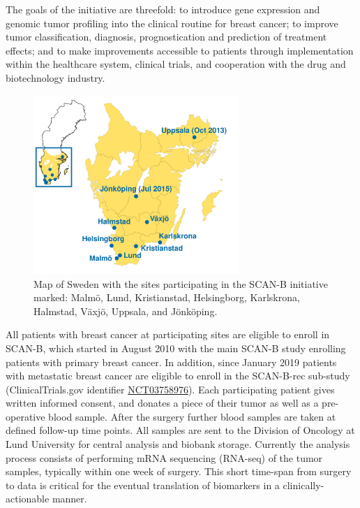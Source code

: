 \documentclass[11pt]{book}
\newcommand{\scanb}{\mbox{SCAN-B}}
\begin{document}
The goals of the initiative are threefold: to introduce gene expression and genomic tumor profiling into the clinical routine for breast cancer; to improve tumor classification, diagnosis, prognostication and prediction of treatment effects; and to make improvements accessible to patients through implementation within the healthcare system, clinical trials, and cooperation with the drug and biotechnology industry.

\begin{figure}[t]
\centering
\includegraphics[width=220pt]{img/SCANB_map_v5.pdf}
\caption[Map of Sites Participating in SCAN-B]{Map of Sweden with the sites participating in the \scanb{} initiative marked: Malmö, Lund, Kristianstad, Helsingborg, Karlskrona, Halmstad, Växjö, Uppsala, and Jönköping.}
\label{fig:scanb-map}
\end{figure}

All patients with breast cancer at participating sites are eligible to enroll in \scanb{}, which started in August 2010 with the main \scanb{} study enrolling patients with primary breast cancer. In addition, since January 2019 patients with metastatic breast cancer are eligible to enroll in the \scanb{}-rec sub-study (ClinicalTrials.gov identifier  \href{https://clinicaltrials.gov/ct2/show/NCT03758976}{NCT03758976}). Each participating patient gives written informed consent, and donates a piece of their tumor as well as a pre-operative blood sample. After the surgery further blood samples are taken at defined follow-up time points. All samples are sent to the Division of Oncology at Lund University for central analysis and biobank storage. Currently the analysis process consists of performing mRNA sequencing (RNA-seq) of the tumor samples, typically within one week of surgery. This short time-span from surgery to data is critical for the eventual translation of biomarkers in a clinically-actionable manner.
\end{document}
